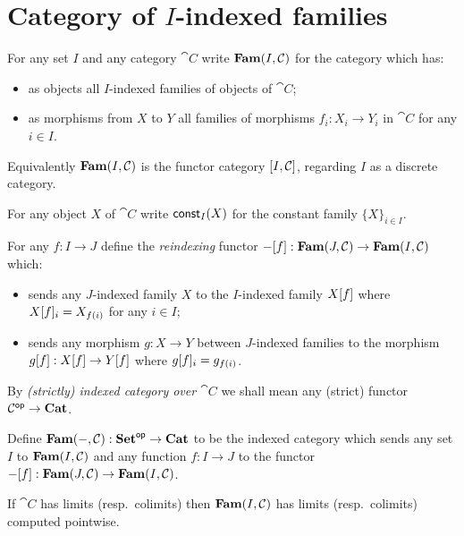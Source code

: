 \section{Category of $I$-indexed families}
\label{sec:fam}

\begin{definition}
\label{def:fam:Fam}
For any set $I$ and any category $\cat{C}$ write $\mathbf{Fam}(I,\mathcal{C})$ for the category which has:
\begin{itemize}
\item as objects all $I$-indexed families of objects of $\cat{C}$;
\item as morphisms from $X$ to $Y$ all families of morphisms $f_i: X_i \to Y_i$ in $\cat{C}$ for any $i \in
I$.
\end{itemize}
\end{definition}

\noindent Equivalently $\mathbf{Fam}(I,\mathcal{C})$ is the functor category $[I,\mathcal{C}]$, regarding $I$ as a
discrete category.

\begin{definition}
For any object $X$ of $\cat{C}$ write $\mathsf{const}_I(X)$ for the constant family $\{X\}_{i \in I}$.
\end{definition}

\begin{definition}[Reindexing]
For any $f: I \to J$ define the \emph{reindexing} functor $-[f]: \mathbf{Fam}(J,\mathcal{C}) \to
\mathbf{Fam}(I,\mathcal{C})$ which:
\begin{itemize}
\item sends any $J$-indexed family $X$ to the $I$-indexed family $X[f]$ where $X[f]_i =
X_{f(i)}$ for any $i \in I$;
\item sends any morphism $g: X \to Y$ between $J$-indexed families to the morphism $g[f]:
X[f] \to Y[f]$ where $g[f]_i = g_{f(i)}$.
\end{itemize}
\end{definition}

By \emph{(strictly) indexed category over $\cat{C}$} we shall mean any (strict) functor $\mathcal{C}^{\mathsf{op}} \to
\mathbf{Cat}$.

\begin{definition}
Define $\mathbf{Fam}(-,\mathcal{C}): \mathbf{Set}^{\mathsf{op}} \to \mathbf{Cat}$ to be the indexed category which sends any set $I$ to
$\mathbf{Fam}(I,\mathcal{C})$ and any function $f: I \to J$ to the functor $-[f]: \mathbf{Fam}(J,\mathcal{C}) \to
\mathbf{Fam}(I,\mathcal{C})$.
\end{definition}

\begin{proposition}
If $\cat{C}$ has limits (resp.~colimits) then $\mathbf{Fam}(I,\mathcal{C})$ has limits (resp.~colimits) computed
pointwise.
\end{proposition}
